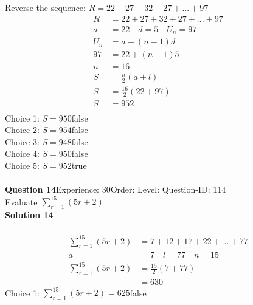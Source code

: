 \documentclass{article}
\begin{document}
Reverse the sequence: $R=22+27+32+27+...+97$
\begin{align*}
R&=22+27+32+27+...+97\\[2pt]
a&=22\quad d=5 \quad U_n=97\\[2pt]
U_n&=a+(n-1)d\\[2pt]
97&=22+(n-1)5\\[2pt]
n&=16\\[12pt]
S&=\displaystyle\frac{n}{2}(a+l)\\[2pt]
S&=\displaystyle\frac{16}{2}(22+97)\\[2pt]
S&=952\\
\end{align*}
Choice 1: \hspace{20pt}$S=950$\hspace{20pt}false\\
Choice 2: \hspace{20pt}$S=954$\hspace{20pt}false\\
Choice 3: \hspace{20pt}$S=948$\hspace{20pt}false\\
Choice 4: \hspace{20pt}$S=950$\hspace{20pt}false\\
Choice 5: \hspace{20pt}$S=952$\hspace{20pt}true\\
\\[4pt]
\noindent\textbf{Question 14}\hspace{20pt}Experience: 30\hspace{20pt}Order: \hspace{20pt}Level: \hspace{20pt}Question-ID: 114\\[2pt]
Evaluate $\displaystyle\sum_{r=1}^{15} (5r+2)$\\[4pt]
\noindent\textbf{Solution 14}\\[2pt]
\\[-35pt]\begin{align*}
\displaystyle\sum_{r=1}^{15} (5r+2)&=7+12+17+22+...+77\\[2pt]
a&=7\quad l=77 \quad n=15\\[2pt]
\displaystyle\sum_{r=1}^{15} (5r+2)&=\displaystyle\frac{15}{2}(7+77)\\[2pt]
&=630
\end{align*}
Choice 1: \hspace{20pt}$\displaystyle\sum_{r=1}^{15} (5r+2)=625$\hspace{20pt}false\\
\end{document}
